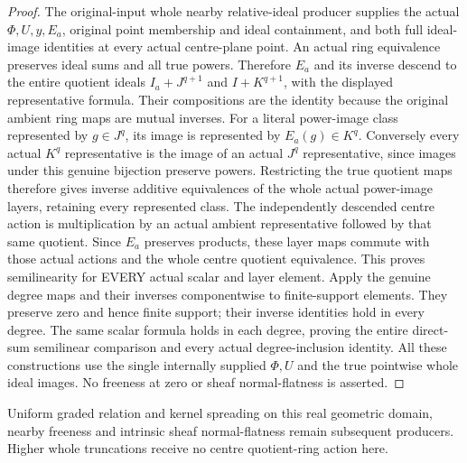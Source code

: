 \begin{proof}
The original-input whole nearby relative-ideal producer supplies the
actual $\Phi,U,y,E_a$, original point membership and ideal containment,
and both full ideal-image identities at every actual centre-plane
point. An actual ring equivalence preserves ideal sums and all true
powers. Therefore $E_a$ and its inverse descend to the entire quotient
ideals $I_a+J^{q+1}$ and $I+K^{q+1}$, with the displayed representative
formula. Their compositions are the identity because the original
ambient ring maps are mutual inverses.
For a literal power-image class represented by $g\in J^q$, its image
is represented by $E_a(g)\in K^q$. Conversely every actual $K^q$
representative is the image of an actual $J^q$ representative, since
images under this genuine bijection preserve powers. Restricting the
true quotient maps therefore gives inverse additive equivalences of
the whole actual power-image layers, retaining every represented
class. The independently descended centre action is multiplication
by an actual ambient representative followed by that same quotient.
Since $E_a$ preserves products, these layer maps commute with those
actual actions and the whole centre quotient equivalence. This proves
semilinearity for EVERY actual scalar and layer element.
Apply the genuine degree maps and their inverses componentwise to
finite-support elements. They preserve zero and hence finite support;
their inverse identities hold in every degree. The same scalar formula
holds in each degree, proving the entire direct-sum semilinear
comparison and every actual degree-inclusion identity. All these
constructions use the single internally supplied $\Phi,U$ and the
true pointwise whole ideal images. No freeness at zero or sheaf
normal-flatness is asserted.
\end{proof}

Uniform graded relation and kernel spreading on this real geometric
domain, nearby freeness and intrinsic sheaf normal-flatness remain
subsequent producers. Higher whole truncations receive no centre
quotient-ring action here.
